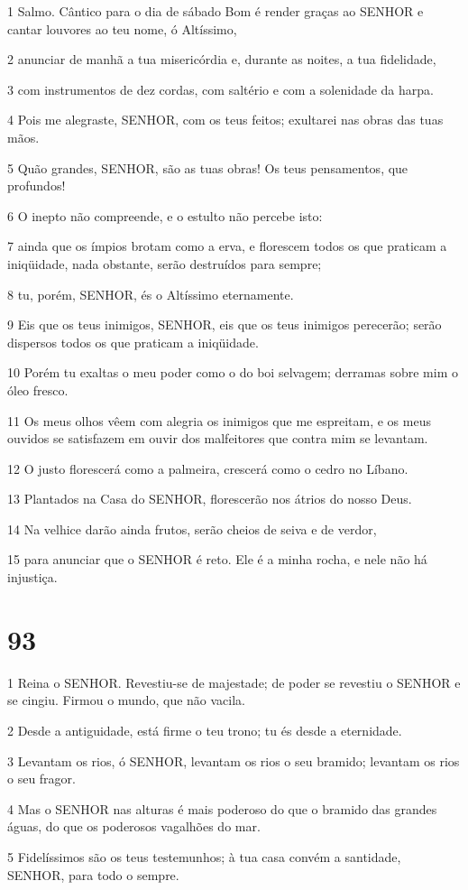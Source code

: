 \par 1 Salmo. Cântico para o dia de sábado Bom é render graças ao SENHOR e cantar louvores ao teu nome, ó Altíssimo,
\par 2 anunciar de manhã a tua misericórdia e, durante as noites, a tua fidelidade,
\par 3 com instrumentos de dez cordas, com saltério e com a solenidade da harpa.
\par 4 Pois me alegraste, SENHOR, com os teus feitos; exultarei nas obras das tuas mãos.
\par 5 Quão grandes, SENHOR, são as tuas obras! Os teus pensamentos, que profundos!
\par 6 O inepto não compreende, e o estulto não percebe isto:
\par 7 ainda que os ímpios brotam como a erva, e florescem todos os que praticam a iniqüidade, nada obstante, serão destruídos para sempre;
\par 8 tu, porém, SENHOR, és o Altíssimo eternamente.
\par 9 Eis que os teus inimigos, SENHOR, eis que os teus inimigos perecerão; serão dispersos todos os que praticam a iniqüidade.
\par 10 Porém tu exaltas o meu poder como o do boi selvagem; derramas sobre mim o óleo fresco.
\par 11 Os meus olhos vêem com alegria os inimigos que me espreitam, e os meus ouvidos se satisfazem em ouvir dos malfeitores que contra mim se levantam.
\par 12 O justo florescerá como a palmeira, crescerá como o cedro no Líbano.
\par 13 Plantados na Casa do SENHOR, florescerão nos átrios do nosso Deus.
\par 14 Na velhice darão ainda frutos, serão cheios de seiva e de verdor,
\par 15 para anunciar que o SENHOR é reto. Ele é a minha rocha, e nele não há injustiça.

\chapter{93}

\par 1 Reina o SENHOR. Revestiu-se de majestade; de poder se revestiu o SENHOR e se cingiu. Firmou o mundo, que não vacila.
\par 2 Desde a antiguidade, está firme o teu trono; tu és desde a eternidade.
\par 3 Levantam os rios, ó SENHOR, levantam os rios o seu bramido; levantam os rios o seu fragor.
\par 4 Mas o SENHOR nas alturas é mais poderoso do que o bramido das grandes águas, do que os poderosos vagalhões do mar.
\par 5 Fidelíssimos são os teus testemunhos; à tua casa convém a santidade, SENHOR, para todo o sempre.

